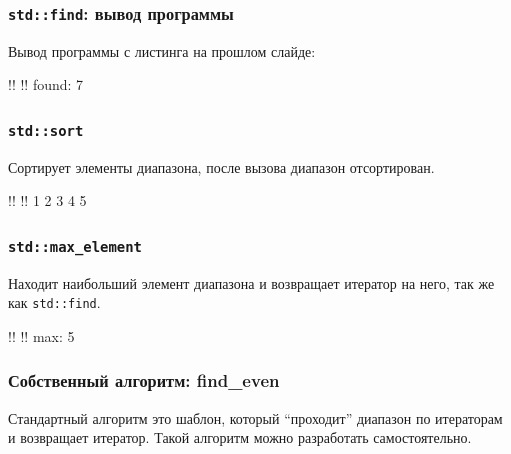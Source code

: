 \documentclass[compress, 8pt, aspectratio=169]{beamer}
\begin{document}
  \begin{frame}[fragile]

    \frametitle{\texttt{std::find}: вывод программы}

    Вывод программы с листинга на прошлом слайде:

    \begin{terminalwindow}
!!
!!
found: 7
    \end{terminalwindow}

  \end{frame}

  \begin{frame}[fragile]

    \frametitle{\texttt{std::sort}}

    Сортирует элементы диапазона, после вызова
    диапазон отсортирован.


    \begin{terminalwindow}
!!
!!
1 2 3 4 5
    \end{terminalwindow}

  \end{frame}

  \begin{frame}[fragile]

    \frametitle{\texttt{std::max\_element}}

    Находит наибольший элемент диапазона и возвращает
    итератор на него, так же как \texttt{std::find}.


    \begin{terminalwindow}
!!
!!
max: 5
    \end{terminalwindow}

  \end{frame}

  \begin{frame}[fragile]

    \frametitle{Собственный алгоритм: find\_even}

    Стандартный алгоритм \textemdash \space это шаблон,
    который \enquote{проходит} диапазон по итераторам
    и возвращает итератор.
    Такой алгоритм можно разработать самостоятельно.


  \end{frame}
\end{document}

